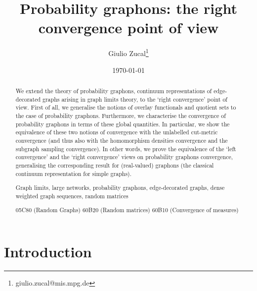 \documentclass[11pt]{article}
\title{Probability graphons: the right convergence point of view}
\author{Giulio Zucal\thanks{giulio.zucal@mis.mpg.de}}
\affil[1]{Max Planck Institute for Mathematics in the Sciences, Leipzig, Germany}
\date{\today}
\begin{document}
\maketitle

\begin{abstract}
We extend the theory of probability graphons, continuum representations of edge-decorated graphs arising in graph limits theory, to the `right convergence’ point of view. First of all, we generalise the notions of overlay functionals and quotient sets to the case of probability graphons. Furthermore, we characterise the convergence of probability graphons in terms of these global quantities. In particular, we show the equivalence of these two notions of convergence with the unlabelled cut-metric convergence (and thus also with the homomorphism densities convergence and the subgraph sampling convergence). In other words, we prove the equivalence of the `left convergence’ and the `right convergence’ views on probability graphons convergence, generalising the corresponding result for (real-valued) graphons (the classical continuum representation for simple graphs).


    \vspace{0.2cm}
  Graph limits, large networks, probability graphons, edge-decorated graphs, dense weighted graph sequences, random matrices   

    \vspace{0.2cm}
  05C80 (Random Graphs)   60B20 (Random matrices) 60B10 (Convergence of measures)
\end{abstract}

\section{Introduction}
\end{document}
